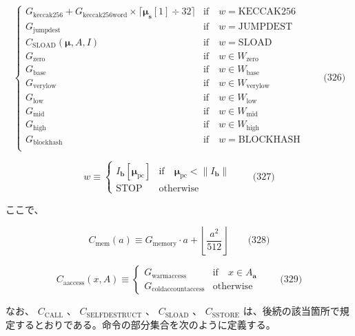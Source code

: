 \documentclass[
]{ltjsarticle}
\begin{document}
\[\begin{cases}
G_{\mathrm{keccak256}}+G_{\mathrm{keccak256word}} \times \lceil \boldsymbol{\mu}_{\mathbf{s}}[1] \div 32 \rceil & \text{if} \quad w = \text{KECCAK256}\\
G_{\mathrm{jumpdest}} & \text{if} \quad w = \text{JUMPDEST}\\
C_\text{SLOAD}(\boldsymbol{\mu}, A, I) & \text{if} \quad w = \text{SLOAD}\\
G_{\mathrm{zero}} & \text{if} \quad w \in W_{\mathrm{zero}}\\
G_{\mathrm{base}} & \text{if} \quad w \in W_{\mathrm{base}}\\
G_{\mathrm{verylow}} & \text{if} \quad w \in W_{\mathrm{verylow}}\\
G_{\mathrm{low}} & \text{if} \quad w \in W_{\mathrm{low}}\\
G_{\mathrm{mid}} & \text{if} \quad w \in W_{\mathrm{mid}}\\
G_{\mathrm{high}} & \text{if} \quad w \in W_{\mathrm{high}}\\
G_{\mathrm{blockhash}} & \text{if} \quad w = \text{BLOCKHASH}\\
\end{cases} \qquad \text{(326)}\]

\protect\hypertarget{eq-327}{}{}

\[w \equiv \begin{cases} I_{\mathbf{b}}[\boldsymbol{\mu}_{\mathrm{pc}}] & \text{if} \quad \boldsymbol{\mu}_{\mathrm{pc}} < \lVert I_{\mathbf{b}} \rVert\\
\text{STOP} & \text{otherwise}
\end{cases} \qquad \text{(327)}\]

ここで、

\protect\hypertarget{eq-328}{}{}

\[C_{\mathrm{mem}}(a) \equiv G_{\mathrm{memory}} \cdot a + \left\lfloor \dfrac{a^2}{512} \right\rfloor \qquad \text{(328)}\]

\protect\hypertarget{eq-329}{}{}

\[C_{\mathrm{aaccess}}(x, A) \equiv
\begin{cases}
G_{\mathrm{warmaccess}}        & \text{if} \quad x \in A_{\mathbf{a}}\\
G_{\mathrm{coldaccountaccess}} & \text{otherwise}
\end{cases} \qquad \text{(329)}\]

なお、 \(C_\text{CALL}\) 、 \(C_\text{SELFDESTRUCT}\) 、
\(C_\text{SLOAD}\) 、 \(C_\text{SSTORE}\)
は、後続の該当箇所で規定するとおりである。命令の部分集合を次のように定義する。
\end{document}
